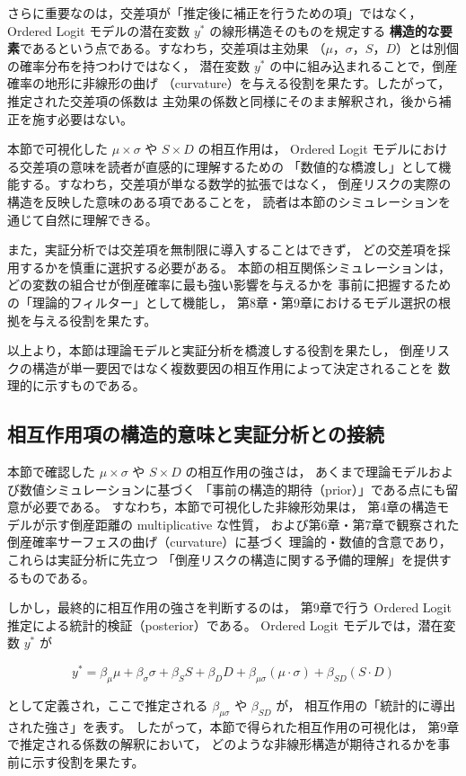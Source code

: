 さらに重要なのは，交差項が「推定後に補正を行うための項」ではなく，
Ordered Logit モデルの潜在変数 $y^*$ の線形構造そのものを規定する
\textbf{構造的な要素}であるという点である。すなわち，交差項は主効果
（$\mu$，$\sigma$，$S$，$D$）とは別個の確率分布を持つわけではなく，
潜在変数 $y^*$ の中に組み込まれることで，倒産確率の地形に非線形の曲げ
（curvature）を与える役割を果たす。したがって，推定された交差項の係数は
主効果の係数と同様にそのまま解釈され，後から補正を施す必要はない。

本節で可視化した $\mu \times \sigma$ や $S \times D$ の相互作用は，
Ordered Logit モデルにおける交差項の意味を読者が直感的に理解するための
「数値的な橋渡し」として機能する。すなわち，交差項が単なる数学的拡張ではなく，
倒産リスクの実際の構造を反映した意味のある項であることを，
読者は本節のシミュレーションを通じて自然に理解できる。

また，実証分析では交差項を無制限に導入することはできず，
どの交差項を採用するかを慎重に選択する必要がある。
本節の相互関係シミュレーションは，どの変数の組合せが倒産確率に最も強い影響を与えるかを
事前に把握するための「理論的フィルター」として機能し，
第8章・第9章におけるモデル選択の根拠を与える役割を果たす。

以上より，本節は理論モデルと実証分析を橋渡しする役割を果たし，
倒産リスクの構造が単一要因ではなく複数要因の相互作用によって決定されることを
数理的に示すものである。

\subsection*{相互作用項の構造的意味と実証分析との接続}

本節で確認した $\mu \times \sigma$ や $S \times D$ の相互作用の強さは，
あくまで理論モデルおよび数値シミュレーションに基づく
「事前の構造的期待（prior）」である点にも留意が必要である。
すなわち，本節で可視化した非線形効果は，
第4章の構造モデルが示す倒産距離の multiplicative な性質，
および第6章・第7章で観察された倒産確率サーフェスの曲げ（curvature）に基づく
理論的・数値的含意であり，これらは実証分析に先立つ
「倒産リスクの構造に関する予備的理解」を提供するものである。

しかし，最終的に相互作用の強さを判断するのは，
第9章で行う Ordered Logit 推定による統計的検証（posterior）である。
Ordered Logit モデルでは，潜在変数 $y^*$ が


\[
y^* = \beta_\mu \mu + \beta_\sigma \sigma + \beta_S S + \beta_D D
+ \beta_{\mu\sigma} (\mu \cdot \sigma)
+ \beta_{SD} (S \cdot D)
\]


として定義され，ここで推定される $\beta_{\mu\sigma}$ や $\beta_{SD}$ が，
相互作用の「統計的に導出された強さ」を表す。
したがって，本節で得られた相互作用の可視化は，
第9章で推定される係数の解釈において，
どのような非線形構造が期待されるかを事前に示す役割を果たす。

